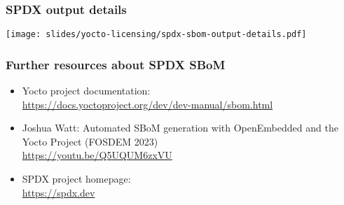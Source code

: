 \begin{frame}[fragile]
  \frametitle{SPDX output details}
  \texttt{[image: slides/yocto-licensing/spdx-sbom-output-details.pdf]}
\end{frame}

\begin{frame}
  \frametitle{Further resources about SPDX SBoM}
    \begin{itemize}
       \item Yocto project documentation:\\
             \url{https://docs.yoctoproject.org/dev/dev-manual/sbom.html}
       \item Joshua Watt: Automated SBoM generation with OpenEmbedded and the Yocto Project (FOSDEM 2023) \\
             \url{https://youtu.be/Q5UQUM6zxVU}
       \item SPDX project homepage:\\
             \url{https://spdx.dev}
    \end{itemize}
\end{frame}

